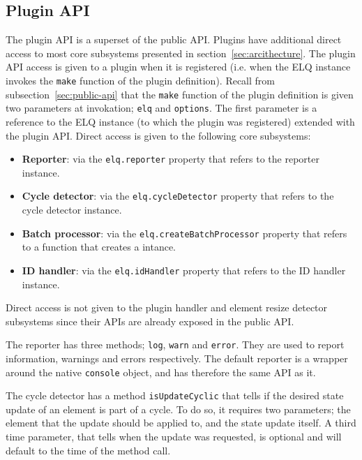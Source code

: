 \documentclass[a4paper,11pt]{kth-mag}
\newcommand{\code}[1]{\texttt{#1}}
\newcommand\abbr[2][]{\uppercase{#2}\ifthenelse{\equal{#1}{}}%
                     {}{#1}}
\begin{document}
        \subsection{Plugin API}
          The plugin \gls{API} is a superset of the public \gls{API}.
          Plugins have additional direct access to most core subsystems presented in section~\ref{sec:arcithecture}.
          The plugin \gls{API} access is given to a plugin when it is registered (i.e. when the \abbr{elq} instance invokes the \code{make} function of the plugin definition).
          Recall from subsection~\ref{sec:public-api} that the \code{make} function of the plugin definition is given two parameters at invokation; \code{elq} and \code{options}.
          The first parameter is a reference to the \abbr{ELQ} instance (to which the plugin was registered) extended with the plugin \gls{API}.
          Direct access is given to the following core subsystems:
          \begin{itemize}
            \item \textbf{Reporter}: via the \code{elq.reporter} property that refers to the reporter instance.
            \item \textbf{Cycle detector}: via the \code{elq.cycleDetector} property that refers to the cycle detector instance.
            \item \textbf{Batch processor}: via the \code{elq.createBatchProcessor} property that refers to a function that creates a  intance.
            \item \textbf{\abbr{ID} handler}: via the \code{elq.idHandler} property that refers to the \abbr{ID} handler instance. 
          \end{itemize}
          Direct access is not given to the plugin handler and element resize detector subsystems since their \glspl{API} are already exposed in the public \gls{API}.

          The reporter has three methods; \code{log}, \code{warn} and \code{error}.
          They are used to report information, warnings and errors respectively.
          The default reporter is a wrapper around the native \code{console} object, and has therefore the same \gls{API} as it.

          The cycle detector has a method \code{isUpdateCyclic} that tells if the desired state update of an element is part of a cycle.
          To do so, it requires two parameters; the element that the update should be applied to, and the state update itself.
          A third time parameter, that tells when the update was requested, is optional and will default to the time of the method call.
\end{document}
